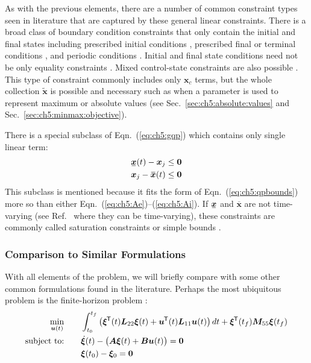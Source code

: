As with the previous \lqdo{} elements, there are a number of common constraint types seen in literature that are captured by these general linear constraints.
There is a broad class of boundary condition constraints that only contain the initial and final states \cite{Gerdts2015a} including prescribed initial conditions \cite{Lack1967a, Bryson1975a, Wang1992a, Anderson2007a, Tang2007a, Sideris2010a, Han2012a}, prescribed final or terminal conditions \cite{Lack1967a, Bashein1971a, Bryson1975a, Jerez2011a}, and periodic conditions \cite{Herber2014a}.
Initial and final state conditions need not be only equality constraints \cite{Jerez2011a}. Mixed control-state constraints are also possible \cite{Sideris2010a, Bryson1975a, Gerdts2015a, Jerez2011a, Han2012a}.
This type of constraint commonly includes only $\bm{x}_c$ terms, but the whole collection $\tilde{\bm{x}}$ is possible and necessary such as when a parameter is used to represent maximum or absolute values (see Sec.~\ref{sec:ch5:absolute:values} and Sec.~\ref{sec:ch5:minmax:objective}).

There is a special subclass of Eqn.~(\ref{eq:ch5:gqp}) which contains only single linear term:%
\begin{subequations}%
\label{eq:ch5:simplebounds}
\begin{align}
\myunderbar{\bm{x}}(t) - \bm{x}_j \leq \bm{0} \\
\bm{x}_j - \overbar{\bm{x}}(t)  \leq \bm{0}
\end{align}
\end{subequations}
\noindent This subclass is mentioned because it fits the form of Eqn.~(\ref{eq:ch5:qpbounds}) more so than either Eqn.~(\ref{eq:ch5:Ae})--(\ref{eq:ch5:Ai}).
If $\myunderbar{\bm{x}}$ and $\overbar{\bm{x}}$ are not time-varying (see Ref.~\cite{Lack1967a} where they can be time-varying), these constraints are commonly called saturation constraints or simple bounds \cite{Bashein1971a}.

\subsubsection{Comparison to Similar Formulations}

With all elements of the \lqdo{} problem, we will briefly compare with some other common formulations found in the literature.
Perhaps the most ubiquitous \lqdo{} problem is the finite-horizon  problem \cite{Liberzon2012a}:%
\begin{subequations}%
\label{eq:ch5:lqr}
\begin{align}
\min_{\bm{u}(t)} \qquad& \int_{t_0}^{t_f} \left( \bm{\xi}^{\mkern-1.5mu\mathsf{T}}(t)\bm{L}_{22}\bm{\xi}(t)  + \bm{u}^{\mkern-1.5mu\mathsf{T}}(t)\bm{L}_{11}\bm{u}(t) \right) dt +  \bm{\xi}^{\mkern-1.5mu\mathsf{T}}(t_f)\bm{M}_{55} \bm{\xi}(t_f) \\
\text{subject to:} \qquad &  \hspace{0.0in} 
\dot{\bm{\xi}}(t) - \big(  \bm{A}\bm{\xi}(t) + \bm{B} \bm{u}(t) \big) = \bm{0} \\
& \bm{\xi}(t_0) - \bm{\xi}_0 = \bm{0}
\end{align}
\end{subequations}%

